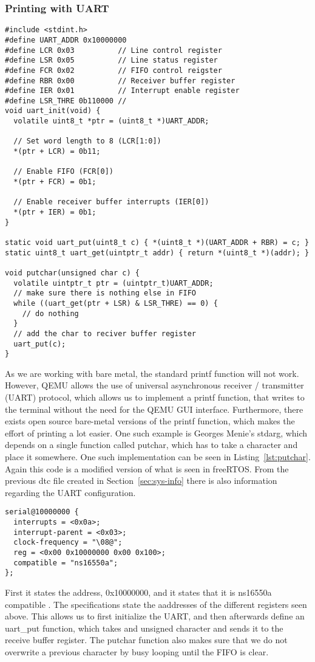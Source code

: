 \subsubsection{Printing with UART}
\begin{lstlisting}[float=*, label=lst:putchar, caption=Implementation of putchar of stdarg lib]
#include <stdint.h>
#define UART_ADDR 0x10000000
#define LCR 0x03          // Line control register
#define LSR 0x05          // Line status register
#define FCR 0x02          // FIFO control reigster
#define RBR 0x00          // Receiver buffer register
#define IER 0x01          // Interrupt enable register
#define LSR_THRE 0b110000 //
void uart_init(void) {
  volatile uint8_t *ptr = (uint8_t *)UART_ADDR;

  // Set word length to 8 (LCR[1:0])
  *(ptr + LCR) = 0b11;

  // Enable FIFO (FCR[0])
  *(ptr + FCR) = 0b1;

  // Enable receiver buffer interrupts (IER[0])
  *(ptr + IER) = 0b1;
}

static void uart_put(uint8_t c) { *(uint8_t *)(UART_ADDR + RBR) = c; }
static uint8_t uart_get(uintptr_t addr) { return *(uint8_t *)(addr); }

void putchar(unsigned char c) {
  volatile uintptr_t ptr = (uintptr_t)UART_ADDR;
  // make sure there is nothing else in FIFO
  while ((uart_get(ptr + LSR) & LSR_THRE) == 0) {
    // do nothing
  }
  // add the char to reciver buffer register
  uart_put(c);
}
\end{lstlisting}
As we are working with bare metal, the standard printf function will not work. However, QEMU
allows the use of universal asynchronous receiver / transmitter (UART) protocol, which allows
us to implement a printf function, that writes to the terminal without the need for the QEMU
GUI interface. Furthermore, there exists open source bare-metal versions of the printf function,
which makes the effort of printing a lot easier. One such example is Georges Menie's stdarg,
which depends on a single function called putchar, which has to take a character and place it
somewhere. One such implementation can be seen in Listing~\ref{lst:putchar}. Again this code is
a modified version of what is seen in freeRTOS. From the previous dtc file created
in Section~\ref{sec:sys-info} there is also information regarding the UART configuration.
\begin{lstlisting}
serial@10000000 {
  interrupts = <0x0a>;
  interrupt-parent = <0x03>;
  clock-frequency = "\08@";
  reg = <0x00 0x10000000 0x00 0x100>;
  compatible = "ns16550a";
};
\end{lstlisting}
First it states the address, 0x10000000, and it states that it is ns16550a compatible
\cite{uart}. The specifications state the aaddresses of the different registers seen above.
This allows us to first initialize the UART, and then afterwards define an uart\_put function,
which takes and unsigned character and sends it to the receive buffer register. The putchar
function also makes sure that we do not overwrite a previous character by busy looping until
the FIFO is clear.



